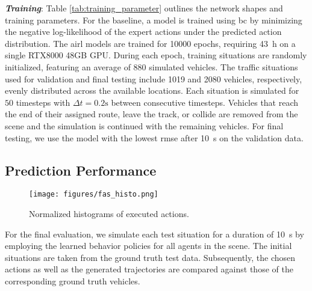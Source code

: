 \documentclass[a4paper,12pt,onecolumn]{article}
\begin{document}
\textbf{\emph{Training}}: 
Table \ref{tab:training_parameter} outlines the network shapes and training parameters. For the baseline, a model is trained using \gls{bc} by minimizing the negative log-likelihood of the expert actions under the predicted action distribution. The \gls{airl} models are trained for \num{10000} epochs, requiring \SI{43}{h} on a single RTX8000 48GB GPU. During each epoch, training situations are randomly initialized, featuring an average of $880$ simulated vehicles. The traffic situations used for validation and final testing include \num{1019} and \num{2080} vehicles, respectively, evenly distributed across the available locations. Each situation is simulated for $50$ timesteps with $\Delta t = 0.2\mathrm{s}$ between consecutive timesteps. Vehicles that reach the end of their assigned route, leave the track, or collide are removed from the scene and the simulation is continued with the remaining vehicles. For final testing, we use the model with the lowest \gls{rmse} after \SI{10}{s} on the validation data.


\subsection{Prediction Performance}

\begin{wrapfigure}{r}{0.5\textwidth} %
\centering
\vspace{-12pt}
    \texttt{[image: figures/fas\_histo.png]}
    \vspace{-30pt}
    \caption{Normalized histograms of executed actions.}
    \label{fig:histo}
    \vspace{-12pt} %
\end{wrapfigure}

For the final evaluation, we simulate each test situation for a duration of \SI{10}{s} by employing the learned behavior policies for all agents in the scene. The initial situations are taken from the ground truth test data. Subsequently, the chosen actions as well as the generated trajectories are compared against those of the corresponding ground truth vehicles.
\end{document}
